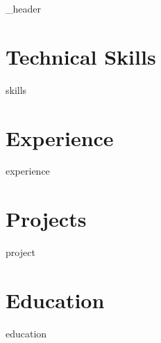 \documentclass[letterpaper,10pt]{article}
\author{Soham Datta}
\begin{document}
{_header}

\section{Technical Skills}
{skills}

\section{Experience}
{experience}

\section{Projects}
{project}

\section{Education}
{education}
\end{document}
